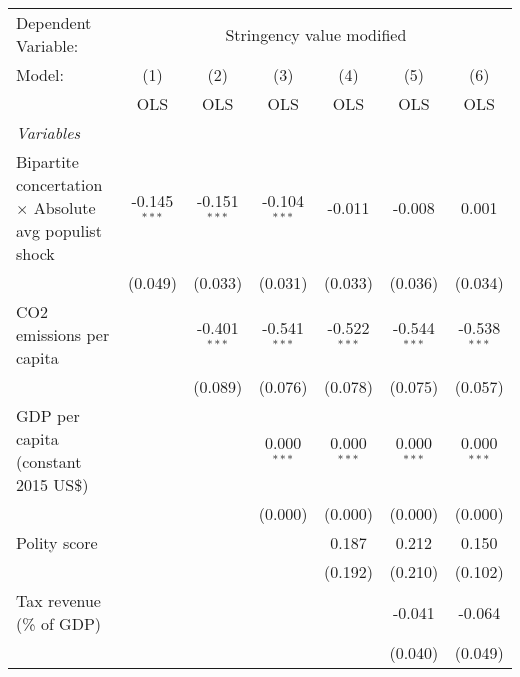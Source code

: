 
\begingroup
\centering
\begin{tabular}{lcccccc}
   \toprule
   Dependent Variable: & \multicolumn{6}{c}{Stringency value modified}\\
   Model:                                                       & (1)            & (2)            & (3)            & (4)            & (5)            & (6)\\  
                                                                &  OLS           & OLS            & OLS            & OLS            & OLS            & OLS\\  
   \midrule
   \emph{Variables}\\
   Bipartite concertation $\times$ Absolute avg populist shock  & -0.145$^{***}$ & -0.151$^{***}$ & -0.104$^{***}$ & -0.011         & -0.008         & 0.001\\   
                                                                & (0.049)        & (0.033)        & (0.031)        & (0.033)        & (0.036)        & (0.034)\\   
   CO2 emissions per capita                                     &                & -0.401$^{***}$ & -0.541$^{***}$ & -0.522$^{***}$ & -0.544$^{***}$ & -0.538$^{***}$\\   
                                                                &                & (0.089)        & (0.076)        & (0.078)        & (0.075)        & (0.057)\\   
   GDP per capita (constant 2015 US\$)                          &                &                & 0.000$^{***}$  & 0.000$^{***}$  & 0.000$^{***}$  & 0.000$^{***}$\\   
                                                                &                &                & (0.000)        & (0.000)        & (0.000)        & (0.000)\\   
   Polity score                                                 &                &                &                & 0.187          & 0.212          & 0.150\\   
                                                                &                &                &                & (0.192)        & (0.210)        & (0.102)\\   
   Tax revenue (\% of GDP)                                      &                &                &                &                & -0.041         & -0.064\\   
                                                                &                &                &                &                & (0.040)        & (0.049)\\   

\end{tabular}
